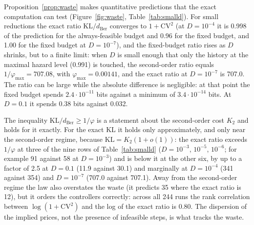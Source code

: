 \documentclass[make,article,submit,pdftex]{Definitions/mdpi}
\providecommand{\KL}{}\renewcommand{\KL}{\mathrm{KL}}
\begin{document}
Proposition~\ref{prop:waste} makes quantitative predictions that the exact computation can test (Figure~\ref{fig:waste}, Table~\ref{tab:smalld}). For small reductions the exact ratio $\KL/d_{\mathrm{Ber}}$ converges to $1+\mathrm{CV}^2$ (at $D=10^{-4}$ it is 0.998 of the prediction for the always-feasible budget and 0.96 for the fixed budget, and 1.00 for the fixed budget at $D=10^{-7}$), and the fixed-budget ratio rises as $D$ shrinks, but to a finite limit: when $D$ is small enough that only the history at the maximal hazard level (0.991) is touched, the second-order ratio equals $1/\varphi_{\max}=707.08$, with $\varphi_{\max}=0.00141$, and the exact ratio at $D=10^{-7}$ is 707.0. The ratio can be large while the absolute difference is negligible: at that point the fixed budget spends $2.4\cdot10^{-11}$ bits against a minimum of $3.4\cdot10^{-14}$ bits. At $D=0.1$ it spends 0.38 bits against 0.032.

The inequality $\KL/d_{\mathrm{Ber}}\ge1/\varphi$ is a statement about the second-order cost $K_2$ and holds for it exactly. For the exact KL it holds only approximately, and only near the second-order regime, because $\KL=K_2(1+o(1))$: the exact ratio exceeds $1/\varphi$ at three of the nine rows of Table~\ref{tab:smalld} ($D=10^{-3}$, $10^{-5}$, $10^{-6}$; for example 91 against 58 at $D=10^{-3}$) and is below it at the other six, by up to a factor of 2.5 at $D=0.1$ (11.9 against 30.1) and marginally at $D=10^{-4}$ (341 against 354) and $D=10^{-7}$ (707.0 against 707.1). Away from the second-order regime the law also overstates the waste (it predicts 35 where the exact ratio is 12), but it orders the controllers correctly: across all 244 runs the rank correlation between $\log(1+\mathrm{CV}^2)$ and the log of the exact ratio is 0.80. The dispersion of the implied prices, not the presence of infeasible steps, is what tracks the waste.
\end{document}
